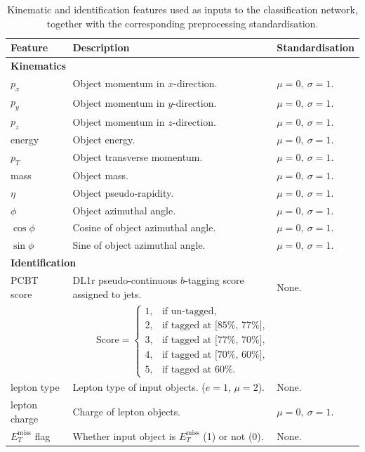 \begin{table}[h!]
\footnotesize
\centering
\renewcommand{\arraystretch}{1.2}
\begin{tabular}{lll}
\hline\hline
\textbf{Feature} & \textbf{Description} & \textbf{Standardisation} \\
\hline
\multicolumn{3}{l}{\textbf{Kinematics}}\\
\hline
$p_{x}$   & Object momentum in $x$-direction. & $\mu = 0, \ \sigma = 1.$ \\
$p_{y}$   & Object momentum in $y$-direction. & $\mu = 0, \ \sigma = 1.$ \\
$p_{z}$   & Object momentum in $z$-direction. & $\mu = 0, \ \sigma = 1.$ \\
energy    & Object energy.                    & $\mu = 0, \ \sigma = 1.$ \\
$p_{T}$   & Object transverse momentum.       & $\mu = 0, \ \sigma = 1.$ \\
mass      & Object mass.                      & $\mu = 0, \ \sigma = 1.$ \\
$\eta$    & Object pseudo-rapidity.           & $\mu = 0, \ \sigma = 1.$ \\
$\phi$    & Object azimuthal angle.           & $\mu = 0, \ \sigma = 1.$ \\
$\cos\phi$& Cosine of object azimuthal angle. & $\mu = 0, \ \sigma = 1.$ \\
$\sin\phi$& Sine of object azimuthal angle.   & $\mu = 0, \ \sigma = 1.$ \\
\hline
\multicolumn{3}{l}{\textbf{Identification}}
\\\hline
PCBT score & DL1r pseudo-continuous $b$-tagging score assigned to jets. &
None. \\
\multicolumn{3}{c}{%
\centering
$
\text{Score} =
\begin{cases}
1, & \text{if un-tagged}, \\
2, & \text{if tagged at [85\%, 77\%]}, \\
3, & \text{if tagged at [77\%, 70\%]}, \\
4, & \text{if tagged at [70\%, 60\%]}, \\
5, & \text{if tagged at 60\%}.
\end{cases}
$} \\
lepton type   & Lepton type of input objects. ($e=1$, $\mu=2$). & None. \\
lepton charge & Charge of lepton objects. & $\mu = 0, \ \sigma = 1.$ \\
$E_{T}^{\text{miss}}$ flag & Whether input object is $E_{T}^{\text{miss}}$ (1) or not (0). & None. \\
\hline\hline
\end{tabular}
\caption{Kinematic and identification features used as inputs to the classification network, together with the corresponding preprocessing standardisation.}
\label{tab:features}
\end{table}

